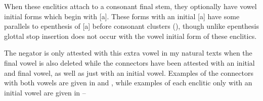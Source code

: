 \begin{exe}
	\label{ex:21}
	\label{ex:5,768}
\end{exe}

When these enclitics attach to a consonant final stem,
they optionally have vowel initial forms which begin with [a].
These forms with an initial [a] have some parallels to epenthesis of [a]
before consonant clusters (),
though unlike epenthesis glottal stop insertion does not occur
with the vowel initial form of these enclitics.

The negator is only attested with this extra vowel in my
natural texts when the final vowel is also deleted
while the connectors have been attested with an initial
and final vowel, as well as just with an initial vowel.
Examples of the connectors with both vowels are given in
 and ,
while examples of each enclitic only with an initial vowel
are given in --


